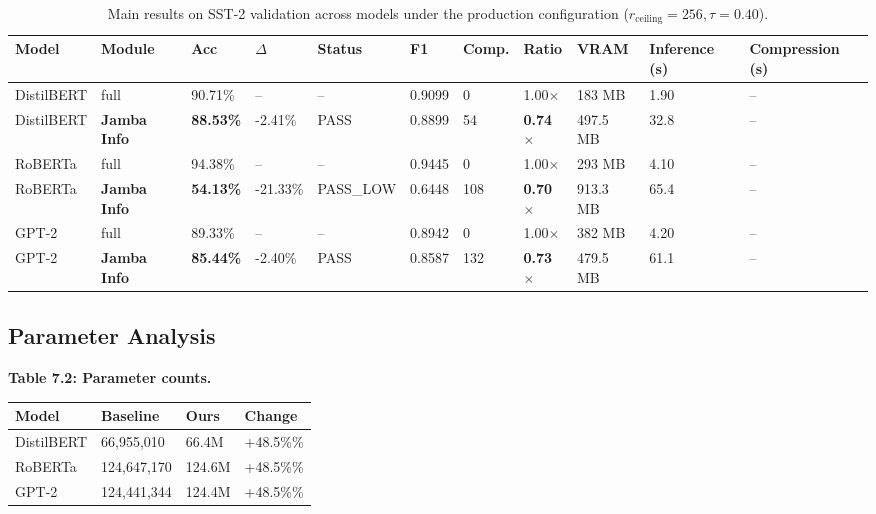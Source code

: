 \begin{table}[t]
\centering
\small
\begin{tabular}{lllllllllll}
\toprule
\textbf{Model} & \textbf{Module} & \textbf{Acc} & \textbf{$\Delta$} & \textbf{Status} & \textbf{F1} & \textbf{Comp.} & \textbf{Ratio} & \textbf{VRAM} & \textbf{Inference (s)} & \textbf{Compression (s)} \\
\midrule
DistilBERT & full & 90.71\% & -- & -- & 0.9099 & 0 & 1.00$\times$ & 183 MB & 1.90 & -- \\
DistilBERT & \textbf{Jamba Info} & \textbf{88.53\%} & -2.41\% & PASS & 0.8899 & 54 & \textbf{0.74$\times$} & 497.5 MB & 32.8 & -- \\
RoBERTa & full & 94.38\% & -- & -- & 0.9445 & 0 & 1.00$\times$ & 293 MB & 4.10 & -- \\
RoBERTa & \textbf{Jamba Info} & \textbf{54.13\%} & -21.33\% & PASS_LOW & 0.6448 & 108 & \textbf{0.70$\times$} & 913.3 MB & 65.4 & -- \\
GPT-2 & full & 89.33\% & -- & -- & 0.8942 & 0 & 1.00$\times$ & 382 MB & 4.20 & -- \\
GPT-2 & \textbf{Jamba Info} & \textbf{85.44\%} & -2.40\% & PASS & 0.8587 & 132 & \textbf{0.73$\times$} & 479.5 MB & 61.1 & -- \\
\bottomrule
\end{tabular}
\caption{Main results on SST-2 validation across models under the production configuration ($r_{\mathrm{ceiling}}=256, \tau=0.40$).}
\label{tab:main_sst2}
\end{table}

\subsection{Parameter Analysis}

\textbf{Table 7.2: Parameter counts.}

\begin{table}[H]
\centering
\small
\begin{tabular}{llll}
\toprule
\textbf{Model} & \textbf{Baseline} & \textbf{Ours} & \textbf{Change} \\
\midrule
DistilBERT & 66,955,010 & 66.4M & +48.5\%\% \\
RoBERTa & 124,647,170 & 124.6M & +48.5\%\% \\
GPT-2 & 124,441,344 & 124.4M & +48.5\%\% \\
\bottomrule
\end{tabular}
\end{table}

